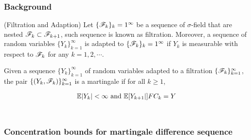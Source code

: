 \subsubsection{Background}

\begin{definition} (Filtration and Adaption)
    Let $\{{\mathscr{F}}_k\}_k=1^\infty$ be a sequence of $\sigma$-field that are nested ${\mathscr{F}}_{k}\subset {\mathscr{F}}_{k+1}$, such sequence is known as filtration. Moreover, a sequence of random variables $\{Y_k\}_{k=1}^\infty$ is adapted to $\{{\mathscr{F}}_k\}_k=1^\infty$ if $Y_k$ is measurable with respect to ${\mathscr{F}}_k$ for any $k=1,2,\cdots$.
\end{definition}

\begin{definition}[Martingale]
Given a sequence $\{Y_k\}_{k=1}^\infty$ of random variables adapted to a filtration $\{{\mathscr{F}}_{k}\}_{k=1}^\infty$, the pair $\{(Y_k, {\mathscr{F}}_k)\}_{k=1}^\infty$ is a martingale if for all $k\ge 1$,

\begin{align*}
    {\mathbb{E}}|Y_k|<\infty \text{ and } {\mathbb{E}}[Y_{k+1}|]FC_k
=Y\end{align*}\
\end{definition}
\subsubsection{Concentration bounds for martingale difference sequence}